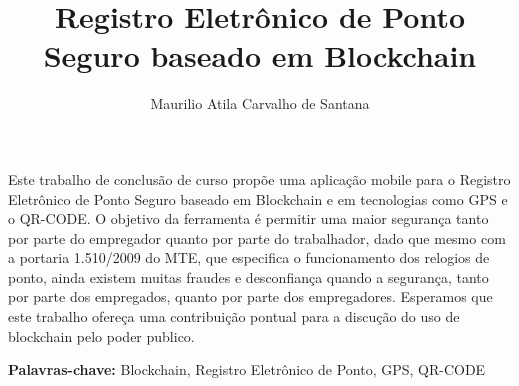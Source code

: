 \documentclass[12pt,openright,twoside,a4paper,english, brazil]{abntex2} %
\title{Registro Eletrônico de Ponto Seguro baseado em Blockchain}
\author{Maurilio Atila Carvalho de Santana}
\begin{document}
\maketitle





\folhaderosto
	

\begin{resumo}

Este trabalho de conclusão de curso propõe uma aplicação mobile para o Registro Eletrônico de Ponto Seguro baseado em Blockchain e em tecnologias como GPS e o QR-CODE. O objetivo da ferramenta é permitir uma maior segurança tanto por parte do empregador quanto por parte do trabalhador, dado que mesmo com a portaria 1.510/2009 do MTE, que especifica o funcionamento dos relogios de ponto, ainda existem muitas fraudes e desconfiança quando a segurança, tanto por parte dos empregados, quanto por parte dos empregadores. Esperamos que este trabalho ofereça uma contribuição pontual para a discução do uso de blockchain pelo poder publico.

\textbf{Palavras-chave: } Blockchain, Registro Eletrônico de Ponto, GPS, QR-CODE

\end{resumo}

%
%
%
\end{document}

